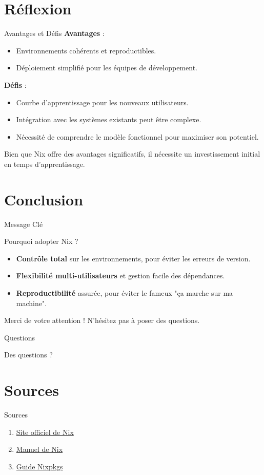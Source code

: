 \documentclass{beamer}
\begin{document}
\section{Réflexion}

\begin{frame}{Avantages et Défis}
    \textbf{Avantages} :
    \begin{itemize}
        \item Environnements cohérents et reproductibles.
        \item Déploiement simplifié pour les équipes de développement.
    \end{itemize}
    \textbf{Défis} :
    \begin{itemize}
        \item Courbe d'apprentissage pour les nouveaux utilisateurs.
        \item Intégration avec les systèmes existants peut être complexe.
        \item Nécessité de comprendre le modèle fonctionnel pour maximiser son potentiel.
    \end{itemize}
    Bien que Nix offre des avantages significatifs, il nécessite un investissement initial en temps d'apprentissage.
\end{frame}
\section{Conclusion}
\begin{frame}{Message Clé}
    \begin{block}{Pourquoi adopter Nix ?}
        \begin{itemize}
            \item \textbf{Contrôle total} sur les environnements, pour éviter les erreurs de version.
            \item \textbf{Flexibilité multi-utilisateurs} et gestion facile des dépendances.
            \item \textbf{Reproductibilité} assurée, pour éviter le fameux "ça
              marche sur ma machine".
        \end{itemize}
    \end{block}
    \begin{center}
        \Large Merci de votre attention ! N'hésitez pas à poser des questions.
    \end{center}
\end{frame}
\begin{frame}{Questions}
	\begin{center}
		\Large Des questions ?
	\end{center}
\end{frame}

\appendix

\section{Sources}

\begin{frame}{Sources}
	\begin{enumerate}
		\item \href{https://nixos.org/}{Site officiel de Nix}
		\item \href{https://nixos.org/manual/nix/stable/}{Manuel de Nix}
		\item \href{https://nixos.org/manual/nixpkgs/stable/}{Guide Nixpkgs}
	\end{enumerate}
\end{frame}
\end{document}
